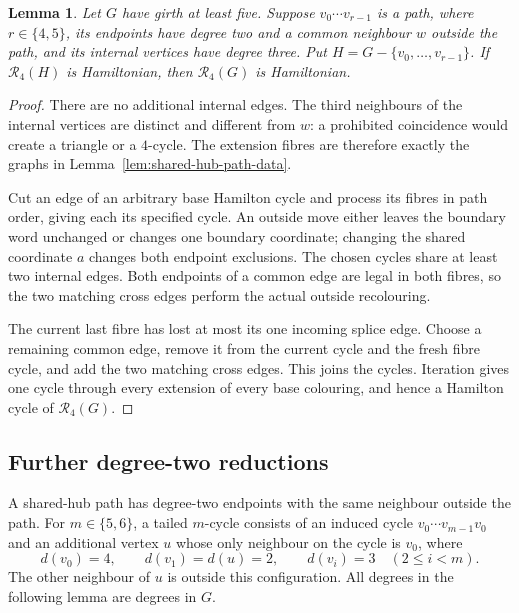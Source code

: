 \documentclass[11pt]{article}
\newtheorem{lemma}[theorem]{Lemma}
\theoremstyle{remark}
\newcommand{\R}{\mathcal R}
\numberwithin{equation}{section}
\numberwithin{table}{section}
\begin{document}
\begin{lemma}\label{lem:shared-hub-paths}
Let $G$ have girth at least five. Suppose $v_0\cdots v_{r-1}$ is a path,
where $r\in\{4,5\}$, its endpoints have degree two and a common neighbour
$w$ outside the path, and its internal vertices have degree three.
Put $H=G-\{v_0,\ldots,v_{r-1}\}$. If $\R_4(H)$ is Hamiltonian,
then $\R_4(G)$ is Hamiltonian.
\end{lemma}
\begin{proof}
There are no additional internal edges. The third neighbours of the internal
vertices are distinct and different from $w$: a prohibited coincidence
would create a triangle or a $4$-cycle. The extension fibres are therefore
exactly the graphs in Lemma~\ref{lem:shared-hub-path-data}.

Cut an edge of an arbitrary base Hamilton cycle and process its fibres in
path order, giving each its specified cycle. An outside move either leaves
the boundary word unchanged or changes one boundary coordinate; changing the
shared coordinate $a$ changes both endpoint exclusions. The chosen cycles
share at least two internal edges. Both endpoints of a common edge are legal
in both fibres, so the two matching cross edges perform the actual outside
recolouring.

The current last fibre has lost at most its one incoming splice edge.
Choose a remaining common edge, remove it from the current cycle and the
fresh fibre cycle, and add the two matching cross edges. This joins the
cycles. Iteration gives one cycle through every extension of every base
colouring, and hence a Hamilton cycle of $\R_4(G)$.
\end{proof}

\subsection{Further degree-two reductions}

A shared-hub path has degree-two endpoints with the same neighbour outside
the path. For $m\in\{5,6\}$, a tailed $m$-cycle consists of an induced
cycle $v_0\cdots v_{m-1}v_0$ and an additional vertex $u$ whose only
neighbour on the cycle is $v_0$, where
\[
 d(v_0)=4,\qquad d(v_1)=d(u)=2,\qquad
 d(v_i)=3\quad(2\le i<m).
\]
The other neighbour of $u$ is outside this configuration. All degrees
in the following lemma are degrees in $G$.
\end{document}
